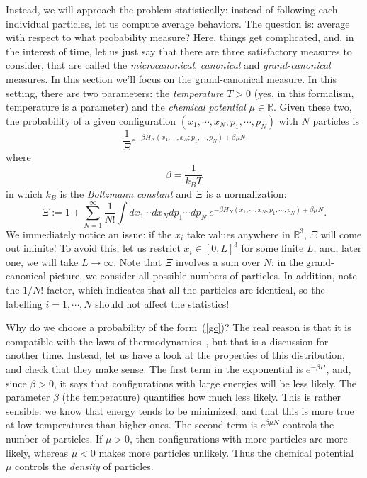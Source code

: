 \documentclass{ian}
\begin{document}
\indent
Instead, we will approach the problem statistically: instead of following each individual particles, let us compute average behaviors.
The question is: average with respect to what probability measure?
Here, things get complicated, and, in the interest of time, let us just say that there are three satisfactory measures to consider, that are called the {\it microcanonical}, {\it canonical} and {\it grand-canonical} measures.
In this section we'll focus on the grand-canonical measure.
In this setting, there are two parameters: the {\it temperature} $T>0$ (yes, in this formalism, temperature is a parameter) and the {\it chemical potential} $\mu\in\mathbb R$.
Given these two, the probability of a given configuration $(x_1,\cdots,x_N;p_1,\cdots,p_N)$ with $N$ particles is
\begin{equation}
  \frac1{\Xi}e^{-\beta H_N(x_1,\cdots,x_N;p_1,\cdots,p_N)+\beta\mu N}
  \label{gc}
\end{equation}
where
\begin{equation}
  \beta=\frac1{k_BT}
\end{equation}
in which $k_B$ is the {\it Boltzmann constant} and $\Xi$ is a normalization:
\begin{equation}
  \Xi:=1+\sum_{N=1}^\infty\frac1{N!}\int dx_1\cdots dx_Ndp_1\cdots dp_N\ e^{-\beta H_N(x_1,\cdots,x_N;p_1,\cdots,p_N)+\beta\mu N}
  .
\end{equation}
We immediately notice an issue: if the $x_i$ take values anywhere in $\mathbb R^3$, $\Xi$ will come out infinite!
To avoid this, let us restrict $x_i\in[0,L]^3$ for some finite $L$, and, later one, we will take $L\to\infty$.
Note that $\Xi$ involves a sum over $N$: in the grand-canonical picture, we consider all possible numbers of particles.
In addition, note the $1/N!$ factor, which indicates that all the particles are identical, so the labelling $i=1,\cdots,N$ should not affect the statistics!
\bigskip

\indent
Why do we choose a probability of the form\-~(\ref{gc})?
The real reason is that it is compatible with the laws of thermodynamics\-~\cite{Ru99,Ga99}, but that is a discussion for another time.
Instead, let us have a look at the properties of this distribution, and check that they make sense.
The first term in the exponential is $e^{-\beta H}$, and, since $\beta>0$, it says that configurations with large energies will be less likely.
The parameter $\beta$ (the temperature) quantifies how much less likely.
This is rather sensible: we know that energy tends to be minimized, and that this is more true at low temperatures than higher ones.
The second term is $e^{\beta\mu N}$ controls the number of particles.
If $\mu>0$, then configurations with more particles are more likely, whereas $\mu<0$ makes more particles unlikely.
Thus the chemical potential $\mu$ controls the {\it density} of particles.
\bigskip
\end{document}
